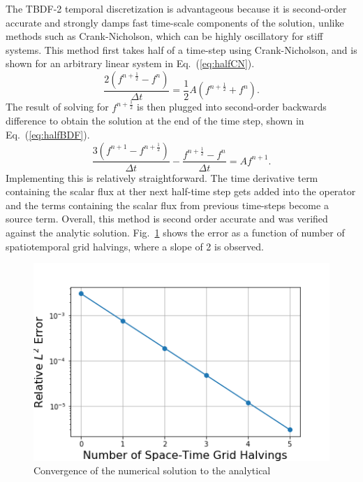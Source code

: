 \documentclass{style/nseJournal}
\newcommand{\fn}[1]{\left( #1 \right)}
\newcommand{\be}{\begin{equation}}
\newcommand{\ee}{\end{equation}}
\newcommand{\LEQ}[1]{\label{eq:#1}}
\newcommand{\EQ}[1]{Eq.~(\ref{eq:#1})}
\newcommand{\LFI}[1]{\label{fi:#1}}
\newcommand{\FI}[1]{Fig.~\ref{fi:#1}}
\newcommand{\bfg}{\begin{figure}}
\newcommand{\efg}{\end{figure}}
\newcommand{\half}{\frac{1}{2}}
\begin{document}
The TBDF-2 temporal discretization is advantageous because it is second-order accurate and strongly damps fast time-scale components of the solution, unlike methods such as Crank-Nicholson, which can be highly oscillatory for stiff systems.  
This method first takes half of a time-step using Crank-Nicholson, and is shown for an arbitrary linear system in \EQ{halfCN}.  
\be
	\frac{2 \fn{ f^{n+\half} - f^n }}{\Delta t} =  \half A \fn{f^{n+\half} + f^n}.
	\LEQ{halfCN} 
\ee
The result of solving for $f^{n+\half}$ is then plugged into second-order backwards difference to obtain the solution at the end of the time step, shown in \EQ{halfBDF}.  
\be
	\frac{3 \fn{ f^{n+1} - f^{n+\half} }}{\Delta t} - \frac{f^{n+\half} - 
		f^n}{\Delta t} = A f^{n+1}.
	\LEQ{halfBDF} 
\ee 
Implementing this is relatively straightforward. 
The time derivative term containing the scalar flux at ther next half-time step gets added into the operator and the terms containing the scalar flux from previous time-steps become a source term.  
Overall, this method is second order accurate and was verified against the analytic solution.  
\FI{2ord} shows the error as a function of number of spatiotemporal grid halvings, where a slope of 2 is observed.
\bfg[h] \centering
	\includegraphics[scale=0.5]{figures/method_convergence.png}
	\caption{Convergence of the numerical solution to the analytical}
	\LFI{2ord}
\efg
\end{document}
